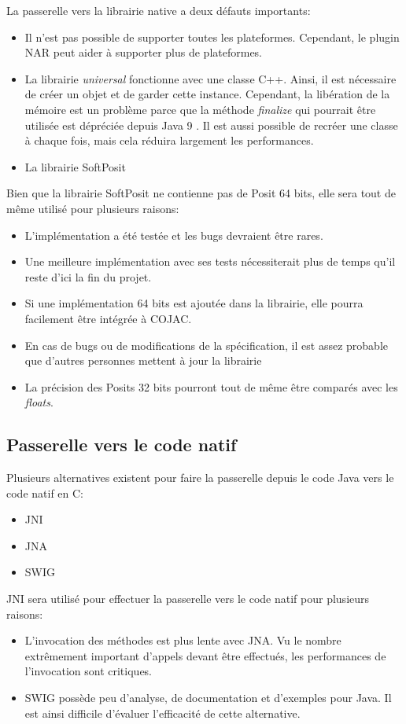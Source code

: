 La passerelle vers la librairie native a deux défauts importants:
\begin{itemize}
    \item Il n'est pas possible de supporter toutes les plateformes. Cependant, le plugin NAR \cite{nar-maven-plugin} peut aider à supporter plus de plateformes.
    \item La librairie \textit{universal} fonctionne avec une classe C++. Ainsi, il est nécessaire de créer un objet et de garder cette instance. Cependant, la libération de la mémoire est un problème parce que la méthode \textit{finalize} qui pourrait être utilisée est dépréciée depuis Java 9 \cite{java-finalize-documentation}. Il est aussi possible de recréer une classe à chaque fois, mais cela réduira largement les performances.
    \item La librairie \gls{SoftPosit}
\end{itemize}

Bien que la librairie \gls{SoftPosit} ne contienne pas de \gls{Posit} 64 bits, elle sera tout de même utilisé pour plusieurs raisons:
\begin{itemize}
    \item L'implémentation a été testée et les bugs devraient être rares.
    \item Une meilleure implémentation avec ses tests nécessiterait plus de temps qu'il reste d'ici la fin du projet.
    \item Si une implémentation 64 bits est ajoutée dans la librairie, elle pourra facilement être intégrée à \gls{COJAC}.
    \item En cas de bugs ou de modifications de la spécification, il est assez probable que d'autres personnes mettent à jour la librairie
    \item La précision des \glspl{Posit} 32 bits pourront tout de même être comparés avec les \textit{floats}.
\end{itemize}

\subsection{Passerelle vers le code natif}

Plusieurs alternatives existent pour faire la passerelle depuis le code Java vers le code natif en C:

\begin{itemize}
    \item \Gls{JNI}
    \item JNA
    \item SWIG
\end{itemize}

\Gls{JNI} sera utilisé pour effectuer la passerelle vers le code natif pour plusieurs raisons:

\begin{itemize}
    \item L'invocation des méthodes est plus lente avec JNA. Vu le nombre extrêmement important d'appels devant être effectués, les performances de l'invocation sont critiques.
    \item SWIG possède peu d'analyse, de documentation et d'exemples pour Java. Il est ainsi difficile d'évaluer l'efficacité de cette alternative.
\end{itemize}
